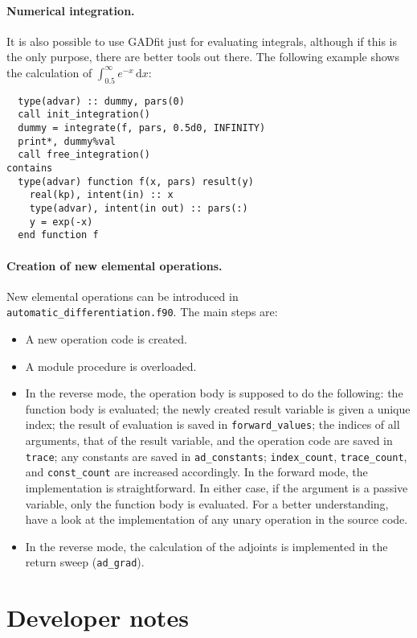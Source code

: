 \documentclass{article}
\newcommand{\D}{\,\textrm{d}}
\begin{document}
\paragraph{Numerical integration.} It is also possible to use GADfit just for evaluating integrals, although if this is the only purpose, there are better tools out there. The following example shows the calculation of $\int_{0.5}^\infty e^{-x}\D x$:
\begin{verbatim}
  type(advar) :: dummy, pars(0)
  call init_integration()
  dummy = integrate(f, pars, 0.5d0, INFINITY)
  print*, dummy%val
  call free_integration()
contains
  type(advar) function f(x, pars) result(y)
    real(kp), intent(in) :: x
    type(advar), intent(in out) :: pars(:)
    y = exp(-x)
  end function f
\end{verbatim}

\paragraph{Creation of new elemental operations.} New elemental operations can be introduced in \verb+automatic_differentiation.f90+. The main steps are:
\begin{itemize}
\item A new operation code is created.
\item A module procedure is overloaded.
\item In the reverse mode, the operation body is supposed to do the following: the function body is evaluated; the newly created result variable is given a unique index; the result of evaluation is saved in \verb+forward_values+; the indices of all arguments, that of the result variable, and the operation code are saved in \verb+trace+; any constants are saved in \verb+ad_constants+; \verb+index_count+, \verb+trace_count+, and \verb+const_count+ are increased accordingly. In the forward mode, the implementation is straightforward. In either case, if the argument is a passive variable, only the function body is evaluated. For a better understanding, have a look at the implementation of any unary operation in the source code.
\item In the reverse mode, the calculation of the adjoints is implemented in the return sweep (\verb+ad_grad+).
\end{itemize}

\section{Developer notes}
\end{document}
